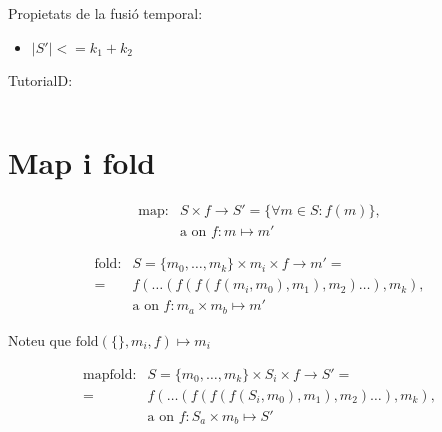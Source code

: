 Propietats de la fusió temporal:
\begin{itemize}
\item $|S'| <= k_1 + k_2$
\end{itemize}





TutorialD:
\begin{verbatim}

\end{verbatim}







\section{Map i fold}

\begin{align*}
  \text{map}:& S \times f \longrightarrow S' = \{\forall m\in S : f(m) \}, \\
             & \text{a on } f: m \mapsto m' 
\end{align*}





\begin{align*}
  \text{fold}: & S=\{m_0,\dotsc,m_k\} \times m_i \times f \longrightarrow m'= \\
               =& f(\dots(f(f(f(m_i,m_0),m_1),m_2)\dots),m_k), \\
               & \text{a on } f: m_a \times m_b \mapsto m'
\end{align*}


Noteu que $\text{fold}(\{\},m_i,f) \mapsto m_i$ 







\begin{align*}
  \text{mapfold}: & S=\{m_0,\dotsc,m_k\} \times S_i \times f \longrightarrow S'= \\
                 =& f(\dots(f(f(f(S_i,m_0),m_1),m_2)\dots),m_k), \\
                  & \text{a on } f: S_a \times m_b \mapsto S'
\end{align*}




